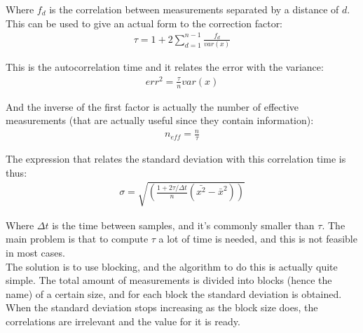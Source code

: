 \documentclass[11pt]{article}
\begin{document}
		Where $f_d$ is the correlation between measurements separated by a distance of $d$. This can be used to give an actual form to the correction factor:\\

		\begin{align}
			\tau=1+2\sum_{d=1}^{n-1}{\frac{f_d}{var\left(x\right)}}
		\end{align}

		This is the autocorrelation time and it relates the error with the variance:\\

		\begin{align}
			err^2=\frac{\tau}{n}var\left(x\right)
		\end{align}

		And the inverse of the first factor is actually the number of effective measurements (that are actually useful since they contain information):\\

		\begin{align}
			n_{eff}=\frac{n}{\tau}
		\end{align}

		The expression that relates the standard deviation with this correlation time is thus:\\

		\begin{align}
			\sigma=\sqrt{\left(\frac{1+2\tau/\Delta t}{n}\left(\bar{x^2}-\bar{x}^2\right)\right)}
		\end{align}

		Where $\Delta t$ is the time between samples, and it's commonly smaller than $\tau$. The main problem is that to compute $\tau$ a lot of time is needed, and this is not feasible in most cases.\\

		The solution is to use blocking, and the algorithm to do this is actually quite simple. The total amount of measurements is divided into blocks (hence the name) of a certain size, and for each block the standard deviation is obtained. When the standard deviation stops increasing as the block size does, the correlations are irrelevant and the value for it is ready.\\
\end{document}
